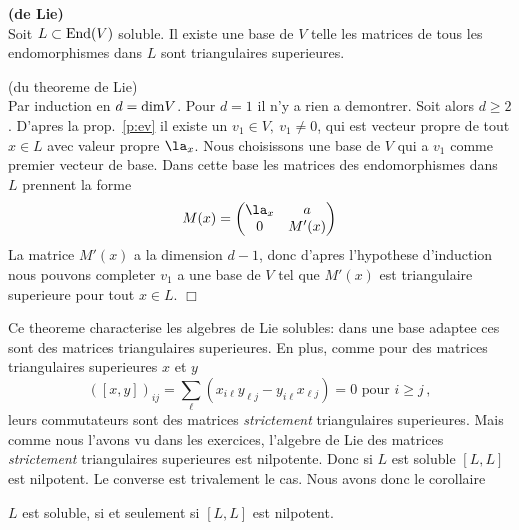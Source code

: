 \begin{ttt} {\bf (de Lie)}\label{t:Lie} \\
Soit $L\subset {\rm End}(V)$ soluble. Il existe une base de $V$ telle les
matrices de tous les endomorphismes dans $L$ sont triangulaires superieures. 
\end{ttt}

\begin{prv} (du theoreme de Lie)\\
Par induction en $d={\rm dim}V$. Pour $d=1$ il n'y a rien a 
demontrer. Soit alors $d\ge 2$. D'apres la prop.~\ref{p:ev} il existe un 
$v_1\in V,~ v_1\neq 0$, qui est vecteur propre de tout $x\in L$ avec valeur propre $\la_x$. 
Nous choisissons une base de $V$ qui
a $v_1$ comme premier vecteur de base. Dans cette base les matrices des  
endomorphismes dans $L$ prennent la forme
$$
M(x) =  \left(\begin{matrix} \la_x & a \\  0 &  M'(x) \end{matrix}\right)
$$
La matrice $M'(x)$ a la dimension $d-1$, donc d'apres l'hypothese d'induction nous pouvons
completer $v_1$ a une base de $V$ tel que $M'(x)$ est triangulaire superieure pour tout $x\in L$.
 \hfill $\Box$
\end{prv}

Ce theoreme characterise les algebres de Lie solubles: dans une base adaptee ces sont des matrices 
triangulaires superieures. En plus, comme pour des matrices triangulaires superieures
$x$ et $y$
$$ \left([x,y]\right)_{ij} = \sum_\ell(x_{i\ell}y_{\ell j} -  y_{i\ell}x_{\ell j}) = 0 \mbox{ pour } i\ge j \,, $$
leurs commutateurs sont des matrices {\em strictement}  triangulaires superieures.
Mais comme nous l'avons vu dans les exercices, l'algebre de Lie des matrices {\em strictement}  
triangulaires superieures est nilpotente. Donc si $L$ est soluble $[L,L]$ est nilpotent. Le converse est trivalement le cas. Nous avons donc le corollaire
\begin{ccc}\label{c1:LLnil} $L$ est soluble, si et seulement si $[L,L]$ est nilpotent.
\end{ccc}

